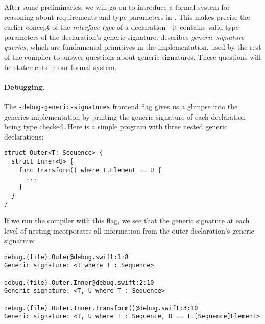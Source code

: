 \documentclass[../generics]{subfiles}
\begin{document}
After some preliminaries, we will go on to introduce a formal system for reasoning about requirements and type parameters in . This makes precise the earlier concept of the \emph{interface type} of a declaration---it contains valid type parameters of the declaration's generic signature.  describes \emph{generic signature queries}, which are fundamental primitives in the implementation, used by the rest of the compiler to answer questions about generic signatures. These questions will be statements in our formal system.

\paragraph{Debugging.} The \texttt{-debug-generic-signatures} frontend flag gives us a glimpse into the generics implementation by printing the generic signature of each declaration being type checked. Here is a simple program with three nested generic declarations:
\begin{Verbatim}
struct Outer<T: Sequence> {
  struct Inner<U> {
    func transform() where T.Element == U {
      ...
    }
  }
}
\end{Verbatim}
If we run the compiler with this flag, we see that the generic signature at each level of nesting incorporates all information from the outer declaration's generic signature:
\begin{Verbatim}
debug.(file).Outer@debug.swift:1:8
Generic signature: <T where T : Sequence>

debug.(file).Outer.Inner@debug.swift:2:10
Generic signature: <T, U where T : Sequence>

debug.(file).Outer.Inner.transform()@debug.swift:3:10
Generic signature: <T, U where T : Sequence, U == T.[Sequence]Element>
\end{Verbatim}
\end{document}
